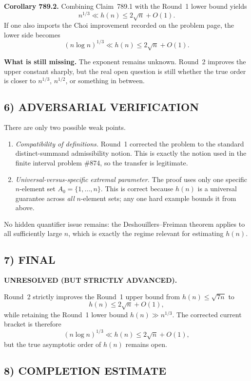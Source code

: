 \medskip
\noindent\textbf{Corollary 789.2.}
Combining Claim~789.1 with the Round~1 lower bound yields
\[
n^{1/3}\ll h(n)\le 2\sqrt n + O(1).
\]
If one also imports the Choi improvement recorded on the problem page, the lower side becomes
\[
(n\log n)^{1/3}\ll h(n)\le 2\sqrt n + O(1).
\]

\medskip
\noindent\textbf{What is still missing.}
The exponent remains unknown. Round~2 improves the upper constant sharply, but the real open question is still whether the true order is closer to \(n^{1/3}\), \(n^{1/2}\), or something in between.

\subsection*{6) ADVERSARIAL VERIFICATION}

There are only two possible weak points.

\begin{enumerate}
\item \emph{Compatibility of definitions.} Round~1 corrected the problem to the standard distinct-summand admissibility notion. This is exactly the notion used in the finite interval problem \#874, so the transfer is legitimate.
\item \emph{Universal-versus-specific extremal parameter.} The proof uses only one specific \(n\)-element set \(A_0=\{1,\dots,n\}\). This is correct because \(h(n)\) is a universal guarantee across \emph{all} \(n\)-element sets; any one hard example bounds it from above.
\end{enumerate}

No hidden quantifier issue remains: the Deshouillers--Freiman theorem applies to all sufficiently large \(n\), which is exactly the regime relevant for estimating \(h(n)\).

\subsection*{7) FINAL}

\textbf{UNRESOLVED (BUT STRICTLY ADVANCED).}

Round~2 strictly improves the Round~1 upper bound from \(h(n)\le \sqrt{7n}\) to
\[
h(n)\le 2\sqrt n + O(1),
\]
while retaining the Round~1 lower bound \(h(n)\gg n^{1/3}\). The corrected current bracket is therefore
\[
(n\log n)^{1/3}\ll h(n)\le 2\sqrt n + O(1),
\]
but the true asymptotic order of \(h(n)\) remains open.

\subsection*{8) COMPLETION ESTIMATE}


